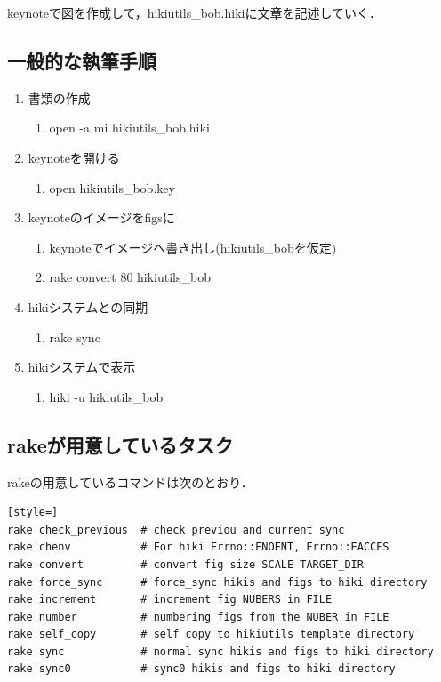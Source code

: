 keynoteで図を作成して，hikiutils\_bob.hikiに文章を記述していく．

\subsection{一般的な執筆手順}\begin{enumerate}
\item 書類の作成\begin{enumerate}
\item open -a mi hikiutils\_bob.hiki
\end{enumerate}
\item keynoteを開ける\begin{enumerate}
\item open hikiutils\_bob.key
\end{enumerate}
\item keynoteのイメージをfigsに\begin{enumerate}
\item keynoteでイメージへ書き出し(hikiutils\_bobを仮定)
\item rake convert 80 hikiutils\_bob
\end{enumerate}
\item hikiシステムとの同期\begin{enumerate}
\item rake sync
\end{enumerate}
\item hikiシステムで表示\begin{enumerate}
\item hiki -u hikiutils\_bob
\end{enumerate}
\end{enumerate}
\subsection{rakeが用意しているタスク}
rakeの用意しているコマンドは次のとおり．
\begin{lstlisting}[style=]
rake check_previous  # check previou and current sync
rake chenv           # For hiki Errno::ENOENT, Errno::EACCES
rake convert         # convert fig size SCALE TARGET_DIR
rake force_sync      # force_sync hikis and figs to hiki directory
rake increment       # increment fig NUBERS in FILE
rake number          # numbering figs from the NUBER in FILE
rake self_copy       # self copy to hikiutils template directory
rake sync            # normal sync hikis and figs to hiki directory
rake sync0           # sync0 hikis and figs to hiki directory
\end{lstlisting}
